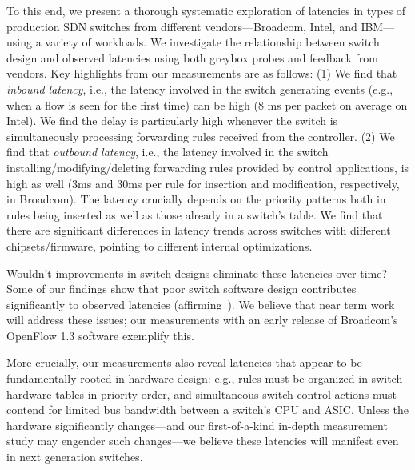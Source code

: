 
To this end, we present a thorough systematic exploration of latencies in 
\numCombos types of production SDN switches from
\numVendors different vendors---Broadcom, Intel, and IBM---using a variety
of workloads. We investigate the relationship between switch design
and observed latencies using both greybox probes and feedback from
vendors. Key highlights from our measurements are as follows: (1) We
find that {\em inbound latency}, i.e., the latency involved in the
switch generating events (e.g., when a flow is seen for the first
time) can be high (8 ms per packet on average on Intel). We find the
delay is particularly high whenever the switch is simultaneously
processing forwarding rules received from the controller. (2) We find
that {\em outbound latency}, i.e., the latency involved in the switch
installing/modifying/deleting forwarding rules provided by control
applications, is high as well (3ms and 30ms per rule for insertion and
modification, respectively, in Broadcom). The latency crucially
depends on the priority patterns both in rules being inserted as well as
those already in a switch's table. We find that there are significant
differences in latency trends across switches with different chipsets/firmware, pointing to
different internal optimizations.


Wouldn't improvements in switch designs eliminate these latencies over
time? Some of our findings show that poor switch software design
contributes significantly to observed latencies
(affirming~\cite{ucsdpaper,oflops}). We believe that near term work
will address these issues; our measurements with an early release of
Broadcom's OpenFlow 1.3 software exemplify this.

More crucially, our measurements also reveal latencies that appear to
be fundamentally rooted in hardware design: e.g., rules must be
organized in switch hardware tables in priority order, and
simultaneous switch control actions must contend for limited bus
bandwidth between a switch's CPU and ASIC. Unless the hardware
significantly changes---and our first-of-a-kind in-depth measurement
study may engender such changes---we believe these latencies will
manifest even in next generation switches.

